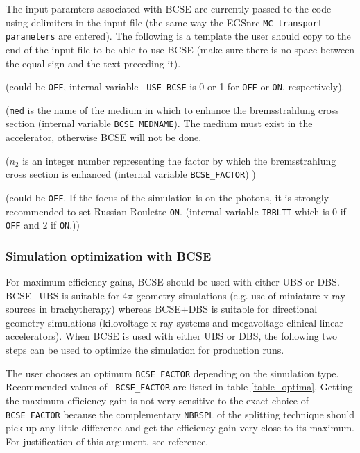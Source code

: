 \documentclass[12pt,twoside]{article}
\begin{document}
\noindent The input paramters associated with BCSE  are currently passed
to the code using delimiters in the input file (the same way the EGSnrc
{\tt MC transport parameters} are entered). The following is a template
the user should copy to the end of the input file to be able to use
BCSE (make sure there is no space between the equal sign and the text
preceding it).


 (could be {\tt OFF}, internal variable {\tt
USE\_BCSE} is 0 or 1 for {\tt OFF} or {\tt ON}, respectively).

 ({\tt med} is the name of
the medium in which to enhance the bremsstrahlung cross
section (internal variable {\tt BCSE\_MEDNAME}).  The medium must exist
in the accelerator, otherwise BCSE will not be done.


 ($n_{2}$ is an integer number
representing the factor by which the bremsstrahlung cross section is
enhanced (internal variable {\tt BCSE\_FACTOR}) )

 (could be {\tt OFF}. If the focus of
the simulation
is on the photons, it is strongly recommended to set Russian Roulette
{\tt ON}. (internal variable {\tt IRRLTT} which is 0 if {\tt OFF} and 2 if
{\tt ON}.))


\subsubsection{Simulation optimization with BCSE}

For maximum efficiency gains, BCSE should be used with either UBS or
DBS. BCSE+UBS is suitable for 4$\pi$-geometry simulations (e.g. use of
miniature x-ray sources in brachytherapy) whereas BCSE+DBS is suitable
for directional geometry simulations (kilovoltage x-ray systems and
megavoltage clinical linear accelerators). When BCSE is used with
either UBS or DBS, the following two steps can be used to optimize the
simulation for production runs.

 The user chooses an optimum {\tt BCSE\_FACTOR}
depending on the simulation type. Recommended values of {\tt
BCSE\_FACTOR} are listed in table \ref{table_optima}. Getting the
maximum efficiency gain is not very sensitive to the exact choice of
{\tt BCSE\_FACTOR} because the complementary {\tt NBRSPL} of the
splitting technique should pick up any little difference and get the
efficiency gain very close to its maximum. For justification of this
argument, see reference\cite{AR07}.
\end{document}
